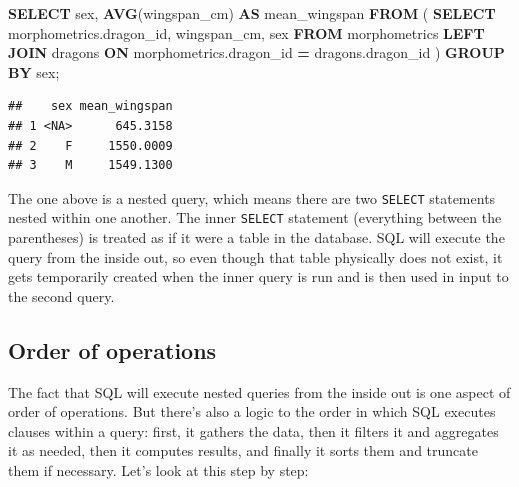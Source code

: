 \documentclass[
]{book}
\newenvironment{Shaded}{\begin{snugshade}}{\end{snugshade}}
\newcommand{\FunctionTok}[1]{\textcolor[rgb]{0.13,0.29,0.53}{\textbf{#1}}}
\newcommand{\KeywordTok}[1]{\textcolor[rgb]{0.13,0.29,0.53}{\textbf{#1}}}
\newcommand{\NormalTok}[1]{#1}
\newcommand{\OperatorTok}[1]{\textcolor[rgb]{0.81,0.36,0.00}{\textbf{#1}}}
\begin{document}
\begin{Shaded}
\begin{Highlighting}[]
\KeywordTok{SELECT}\NormalTok{ sex, }\FunctionTok{AVG}\NormalTok{(wingspan\_cm) }\KeywordTok{AS}\NormalTok{ mean\_wingspan}
\KeywordTok{FROM}\NormalTok{ (}
    \KeywordTok{SELECT}\NormalTok{ morphometrics.dragon\_id, wingspan\_cm, sex}
    \KeywordTok{FROM}\NormalTok{ morphometrics }
    \KeywordTok{LEFT} \KeywordTok{JOIN}\NormalTok{ dragons }
    \KeywordTok{ON}\NormalTok{ morphometrics.dragon\_id }\OperatorTok{=}\NormalTok{ dragons.dragon\_id}
\NormalTok{    )}
\KeywordTok{GROUP} \KeywordTok{BY}\NormalTok{ sex; }
\end{Highlighting}
\end{Shaded}

\begin{verbatim}
##    sex mean_wingspan
## 1 <NA>      645.3158
## 2    F     1550.0009
## 3    M     1549.1300
\end{verbatim}

The one above is a nested query, which means there are two \texttt{SELECT} statements
nested within one another. The inner \texttt{SELECT} statement (everything between the
parentheses) is treated as if it were a table in the database. SQL will
execute the query from the inside out, so even though that table physically does
not exist, it gets temporarily created when the inner query is run and is then
used in input to the second query.

\hypertarget{order-of-operations}{%
\subsection{Order of operations}\label{order-of-operations}}

The fact that SQL will execute nested queries from the inside out is one aspect
of order of operations. But there's also a logic to the order in which SQL
executes clauses within a query: first, it gathers the data, then it filters it
and aggregates it as needed, then it computes results, and finally it sorts them
and truncate them if necessary. Let's look at this step by step:
\end{document}
